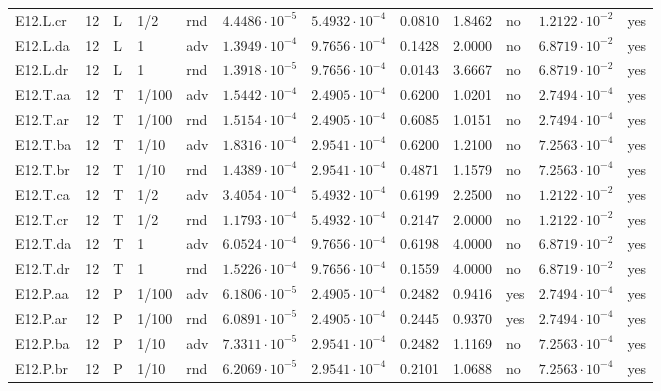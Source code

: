 {\begin{longtable}{@{}lllllllllll l@{}}
E12.L.cr & 12 & L & 1/2 & rnd & $4.4486\cdot 10^{-5}$ & $5.4932\cdot 10^{-4}$ & 0.0810 & 1.8462 & no & $1.2122\cdot 10^{-2}$ & yes \\
E12.L.da & 12 & L & 1 & adv & $1.3949\cdot 10^{-4}$ & $9.7656\cdot 10^{-4}$ & 0.1428 & 2.0000 & no & $6.8719\cdot 10^{-2}$ & yes \\
E12.L.dr & 12 & L & 1 & rnd & $1.3918\cdot 10^{-5}$ & $9.7656\cdot 10^{-4}$ & 0.0143 & 3.6667 & no & $6.8719\cdot 10^{-2}$ & yes \\
E12.T.aa & 12 & T & 1/100 & adv & $1.5442\cdot 10^{-4}$ & $2.4905\cdot 10^{-4}$ & 0.6200 & 1.0201 & no & $2.7494\cdot 10^{-4}$ & yes \\
E12.T.ar & 12 & T & 1/100 & rnd & $1.5154\cdot 10^{-4}$ & $2.4905\cdot 10^{-4}$ & 0.6085 & 1.0151 & no & $2.7494\cdot 10^{-4}$ & yes \\
E12.T.ba & 12 & T & 1/10 & adv & $1.8316\cdot 10^{-4}$ & $2.9541\cdot 10^{-4}$ & 0.6200 & 1.2100 & no & $7.2563\cdot 10^{-4}$ & yes \\
E12.T.br & 12 & T & 1/10 & rnd & $1.4389\cdot 10^{-4}$ & $2.9541\cdot 10^{-4}$ & 0.4871 & 1.1579 & no & $7.2563\cdot 10^{-4}$ & yes \\
E12.T.ca & 12 & T & 1/2 & adv & $3.4054\cdot 10^{-4}$ & $5.4932\cdot 10^{-4}$ & 0.6199 & 2.2500 & no & $1.2122\cdot 10^{-2}$ & yes \\
E12.T.cr & 12 & T & 1/2 & rnd & $1.1793\cdot 10^{-4}$ & $5.4932\cdot 10^{-4}$ & 0.2147 & 2.0000 & no & $1.2122\cdot 10^{-2}$ & yes \\
E12.T.da & 12 & T & 1 & adv & $6.0524\cdot 10^{-4}$ & $9.7656\cdot 10^{-4}$ & 0.6198 & 4.0000 & no & $6.8719\cdot 10^{-2}$ & yes \\
E12.T.dr & 12 & T & 1 & rnd & $1.5226\cdot 10^{-4}$ & $9.7656\cdot 10^{-4}$ & 0.1559 & 4.0000 & no & $6.8719\cdot 10^{-2}$ & yes \\
E12.P.aa & 12 & P & 1/100 & adv & $6.1806\cdot 10^{-5}$ & $2.4905\cdot 10^{-4}$ & 0.2482 & 0.9416 & yes & $2.7494\cdot 10^{-4}$ & yes \\
E12.P.ar & 12 & P & 1/100 & rnd & $6.0891\cdot 10^{-5}$ & $2.4905\cdot 10^{-4}$ & 0.2445 & 0.9370 & yes & $2.7494\cdot 10^{-4}$ & yes \\
E12.P.ba & 12 & P & 1/10 & adv & $7.3311\cdot 10^{-5}$ & $2.9541\cdot 10^{-4}$ & 0.2482 & 1.1169 & no & $7.2563\cdot 10^{-4}$ & yes \\
E12.P.br & 12 & P & 1/10 & rnd & $6.2069\cdot 10^{-5}$ & $2.9541\cdot 10^{-4}$ & 0.2101 & 1.0688 & no & $7.2563\cdot 10^{-4}$ & yes \\

\end{longtable}}
